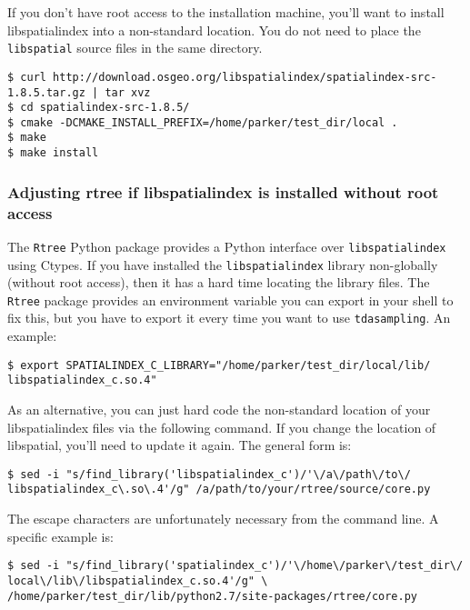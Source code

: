 \documentclass[11pt]{article}
\begin{document}
If you don't have root access to the installation machine, you'll want to install libspatialindex into a non-standard location. You do not need to place the \texttt{libspatial} source files in the same directory.

\begin{verbatim} 
$ curl http://download.osgeo.org/libspatialindex/spatialindex-src-1.8.5.tar.gz | tar xvz
$ cd spatialindex-src-1.8.5/
$ cmake -DCMAKE_INSTALL_PREFIX=/home/parker/test_dir/local .
$ make 
$ make install
\end{verbatim} 

\subsubsection{Adjusting rtree if libspatialindex is installed without root access}
The \texttt{Rtree} Python package provides a Python interface over \texttt{libspatialindex} using Ctypes. If you have installed the \texttt{libspatialindex} library non-globally (without root access), then it has a hard time locating the library files. The \texttt{Rtree} package provides an environment variable you can export in your shell to fix this, but you have to export it every time you want to use \texttt{tdasampling}. An example: 

\begin{verbatim} 
$ export SPATIALINDEX_C_LIBRARY="/home/parker/test_dir/local/lib/
libspatialindex_c.so.4"
\end{verbatim} 

As an alternative, you can just hard code the non-standard location of your libspatialindex files via the following command. If you change the location of libspatial, you'll need to update it again. The general form is: 

\begin{verbatim} 
$ sed -i "s/find_library('libspatialindex_c')/'\/a\/path\/to\/
libspatialindex_c\.so\.4'/g" /a/path/to/your/rtree/source/core.py
\end{verbatim} 

The escape characters are unfortunately necessary from the command line. A specific example is:

\begin{verbatim} 
$ sed -i "s/find_library('spatialindex_c')/'\/home\/parker\/test_dir\/
local\/lib\/libspatialindex_c.so.4'/g" \
/home/parker/test_dir/lib/python2.7/site-packages/rtree/core.py
\end{verbatim} 
\end{document}
